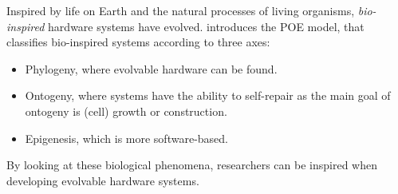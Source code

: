 
Inspired by life on Earth and the natural processes of living organisms, \emph{bio-inspired} hardware systems have evolved. \cite{poe} introduces the POE model, that classifies bio-inspired systems according to three axes:
\begin{itemize}
	\item Phylogeny, where evolvable hardware can be found.
	\item Ontogeny, where systems have the ability to self-repair as the main goal of ontogeny is (cell) growth or construction.
	\item Epigenesis, which is more software-based.
\end{itemize}

By looking at these biological phenomena, researchers can be inspired when developing evolvable hardware systems.